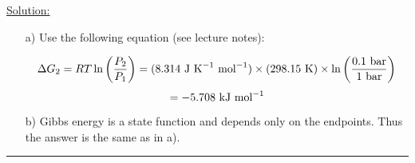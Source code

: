 \noindent
\underline{Solution:}\\

\begin{itemize}
\item[a)] Use the following equation (see lecture notes):

$$\Delta G_2 = RT\ln\left(\frac{P_2}{P_1}\right) = (8.314\textnormal{ J K}^{-1}\textnormal{ mol}^{-1})\times (298.15\textnormal{ K})\times\ln\left(\frac{0.1\textnormal{ bar}}{1\textnormal{ bar}}\right)$$
$$ = -5.708\textnormal{ kJ mol}^{-1}$$

\item[b)] Gibbs energy is a state function and depends only on the endpoints. Thus the answer is the same as in a).

\end{itemize}

\hrule\vspace{0.5cm}
